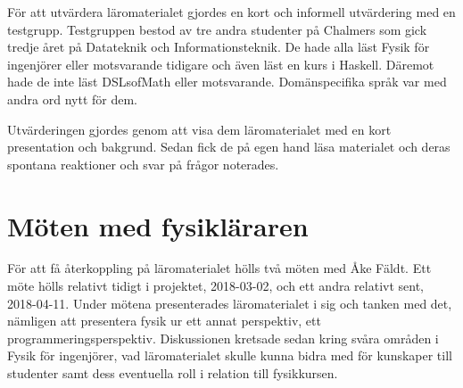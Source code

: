 För att utvärdera läromaterialet gjordes en kort och informell utvärdering med
en testgrupp. Testgruppen bestod av tre andra studenter på Chalmers som gick
tredje året på Datateknik och Informationsteknik. De hade alla läst Fysik för
ingenjörer eller motsvarande tidigare och även läst en kurs i Haskell.
Däremot hade de inte läst DSLsofMath eller motsvarande. Domänspecifika språk var
med andra ord nytt för dem.

Utvärderingen gjordes genom att visa dem läromaterialet med en kort
presentation och bakgrund. Sedan fick de på egen hand läsa materialet och deras
spontana reaktioner och svar på frågor noterades.

\section{Möten med fysikläraren}

För att få återkoppling på läromaterialet hölls två möten med Åke Fäldt. Ett möte hölls relativt
tidigt i projektet, 2018-03-02, och ett andra relativt sent, 2018-04-11.
Under mötena presenterades läromaterialet i sig och tanken med det, nämligen att
presentera fysik ur ett annat perspektiv, ett
programmeringsperspektiv. Diskussionen kretsade sedan kring svåra områden i Fysik för
ingenjörer, vad läromaterialet skulle kunna
bidra med för kunskaper till studenter samt dess eventuella roll i relation till
fysikkursen.
